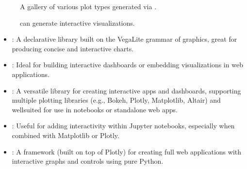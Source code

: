 \documentclass[letterpaper,10pt,english]{jupyterBook}
\begin{document}
\begin{figure}[htbp]
\centering
\capstart

\noindent{}
\caption{A gallery of various plot types generated via .}\label{\detokenize{chapters/03/03b_visualization-tools:plotly}}\end{figure}

\begin{figure}[htbp]
\centering
\capstart

\noindent{}
\caption{ can generate interactive visualizations.}\label{\detokenize{chapters/03/03b_visualization-tools:plotly-interactive}}\end{figure}
\begin{itemize}
\item {} 
\sphinxAtStartPar
{}: A declarative library built on the Vega\sphinxhyphen{}Lite grammar of graphics, great for producing concise and interactive charts.

\item {} 
\sphinxAtStartPar
{}: Ideal for building interactive dashboards or embedding visualizations in web applications.

\item {} 
\sphinxAtStartPar
{}: A versatile library for creating interactive apps and dashboards, supporting multiple plotting libraries (e.g., Bokeh, Plotly, Matplotlib, Altair) and well\sphinxhyphen{}suited for use in notebooks or standalone web apps.

\item {} 
\sphinxAtStartPar
{}: Useful for adding interactivity within Jupyter notebooks, especially when combined with Matplotlib or Plotly.

\item {} 
\sphinxAtStartPar
{}: A framework (built on top of Plotly) for creating full web applications with interactive graphs and controls using pure Python.

\end{itemize}
\end{document}
